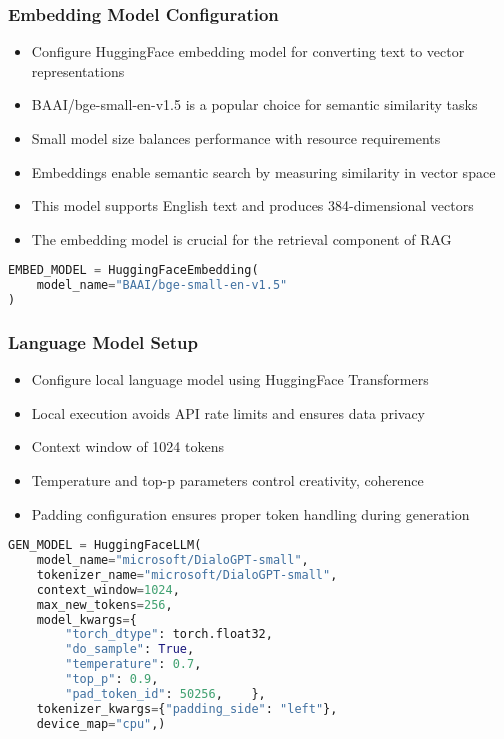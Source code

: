 \begin{frame}[fragile]\frametitle{Embedding Model Configuration}
      \begin{itemize}
          \item Configure HuggingFace embedding model for converting text to vector representations
          \item BAAI/bge-small-en-v1.5 is a popular choice for semantic similarity tasks
          \item Small model size balances performance with resource requirements
          \item Embeddings enable semantic search by measuring similarity in vector space
          \item This model supports English text and produces 384-dimensional vectors
          \item The embedding model is crucial for the retrieval component of RAG
      \end{itemize}
      
\begin{lstlisting}[language=Python]
EMBED_MODEL = HuggingFaceEmbedding(
    model_name="BAAI/bge-small-en-v1.5"
)
\end{lstlisting}
\end{frame}

\begin{frame}[fragile]\frametitle{Language Model Setup}
      \begin{itemize}
          \item Configure local language model using HuggingFace Transformers
          \item Local execution avoids API rate limits and ensures data privacy
          \item Context window of 1024 tokens 
          \item Temperature and top-p parameters control creativity, coherence
          \item Padding configuration ensures proper token handling during generation
      \end{itemize}
      
\begin{lstlisting}[language=Python]
GEN_MODEL = HuggingFaceLLM(
    model_name="microsoft/DialoGPT-small",
    tokenizer_name="microsoft/DialoGPT-small",
    context_window=1024,
    max_new_tokens=256,
    model_kwargs={
        "torch_dtype": torch.float32,
        "do_sample": True,
        "temperature": 0.7,
        "top_p": 0.9,
        "pad_token_id": 50256,    },
    tokenizer_kwargs={"padding_side": "left"},
    device_map="cpu",)
\end{lstlisting}
\end{frame}

